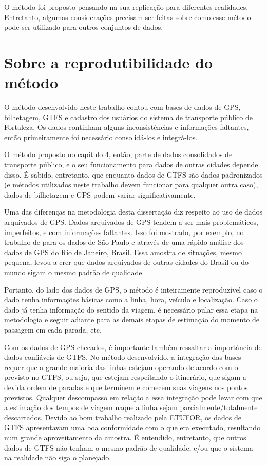 \documentclass[        
    a4paper,          %
    12pt,             %
    chapter=TITLE,    %
    section=Title,    %
    subsection=Title, %
    oneside,          %
    english,          %
    spanish,          %
    brazil,           %
    fleqn             %
]{abntex2}
\begin{document}
  O método foi proposto pensando na sua replicação para diferentes realidades. Entretanto, algumas considerações precisam ser feitas sobre como esse método pode ser utilizado para outros conjuntos de dados.
  
  \hypertarget{sobre-a-reprodutibilidade-do-metodo}{%
  \section{Sobre a reprodutibilidade do método}\label{sobre-a-reprodutibilidade-do-metodo}}
  
  O método desenvolvido neste trabalho contou com bases de dados de GPS, bilhetagem, GTFS e cadastro dos usuários do sistema de transporte público de Fortaleza. Os dados continham alguns inconsistências e informações faltantes, então primeiramente foi necessário consolidá-los e integrá-los.
  
  O método proposto no capítulo 4, então, parte de dados consolidados de transporte público, e o seu funcionamento para dados de outras cidades depende disso. É sabido, entretanto, que enquanto dados de GTFS são dados padronizados (e métodos utilizados neste trabalho devem funcionar para qualquer outra caso), dados de bilhetagem e GPS podem variar significativamente.
  
  Uma das diferenças na metodologia desta dissertação diz respeito ao uso de dados arquivados de GPS. Dados arquivados de GPS tendem a ser mais problemáticos, imperfeitos, e com informações faltantes. Isso foi mostrado, por exemplo, no trabalho de \citet{Arbex2016} para os dados de São Paulo e através de uma rápido análise dos dados de GPS do Rio de Janeiro, Brasil. Essa amostra de situações, mesmo pequena, levou a crer que dados arquivados de outras cidades do Brasil ou do mundo sigam o mesmo padrão de qualidade.
  
  Portanto, do lado dos dados de GPS, o método é inteiramente reproduzível caso o dado tenha informações básicas como a linha, hora, veículo e localização. Caso o dado já tenha informação do sentido da viagem, é necessário pular essa etapa na metodologia e seguir adiante para as demais etapas de estimação do momento de passagem em cada parada, etc.
  
  Com os dados de GPS checados, é importante também ressaltar a importância de dados confiáveis de GTFS. No método desenvolvido, a integração das bases requer que a grande maioria das linhas estejam operando de acordo com o previsto no GTFS, ou seja, que estejam respeitando o itinerário, que sigam a devida ordem de paradas e que terminem e comecem suas viagens nos pontos previstos. Qualquer descompasso em relação a essa integração pode levar com que a estimação dos tempos de viagem naquela linha sejam parcialmente/totalmente descartados. Devido ao bom trabalho realizado pela ETUFOR, os dados de GTFS apresentavam uma boa conformidade com o que era executado, resultando num grande aproveitamento da amostra. É entendido, entretanto, que outros dados de GTFS não tenham o mesmo padrão de qualidade, e/ou que o sistema na realidade não siga o planejado.
  
\end{document}
